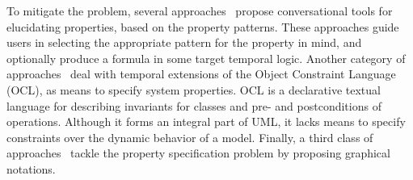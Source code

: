 \documentclass[letter]{llncs}
\begin{document}
To mitigate the problem, several approaches~\cite{Smith02propel:an,konrad2005facilitating,Mondragon_prospec} propose conversational tools for
elucidating properties, based on the property patterns. These approaches guide users in selecting the appropriate pattern
for the property in mind, and optionally produce a formula in some target temporal logic. 
Another category of approaches~\cite{Ziemann02anextension,Flake03formalsemantics,Ackermann:2006:LOS:2135315.2135339} deal with temporal extensions 
of the Object Constraint Language (OCL), as means to specify system
properties. OCL is a declarative textual language for describing invariants for
classes and pre- and postconditions of operations. Although it forms an integral
part of UML, it lacks means to specify constraints over the dynamic behavior
of a model. Finally, a third class of approaches~\cite{Autili:2007:GSS:1290845.1290859,Lee97agraphical,Smith:2001:ECG:882477.883639,Knapp:2006:MCU:1762828.1762836,Lilius99vuml:a,Kugler:2005:TLS:2140653.2140692,MVPSA} tackle the property
specification problem by proposing graphical notations.
\end{document}
